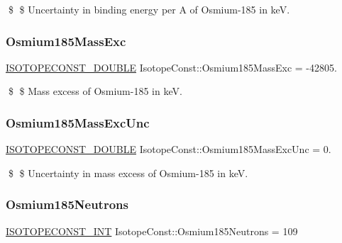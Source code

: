 \$ \$ Uncertainty in binding energy per A of Osmium-\/185 in keV. \mbox{\label{group___isotope_const-_osmium-_os185_ga5efefbb9a0abbb4d38bd90703bee7a6f}} 
\subsubsection{\texorpdfstring{Osmium185\+Mass\+Exc}{Osmium185MassExc}}
{\footnotesize\ttfamily \mbox{\hyperlink{group___isotope_const-_macros_ga8f45a7272ce02c0b4c65c44636ed719a}{I\+S\+O\+T\+O\+P\+E\+C\+O\+N\+S\+T\+\_\+\+D\+O\+U\+B\+LE}} Isotope\+Const\+::\+Osmium185\+Mass\+Exc = -\/42805.}

\$ \$ Mass excess of Osmium-\/185 in keV. \mbox{\label{group___isotope_const-_osmium-_os185_ga3ee3e0e8220e9ed0fe242b09e0298a56}} 
\subsubsection{\texorpdfstring{Osmium185\+Mass\+Exc\+Unc}{Osmium185MassExcUnc}}
{\footnotesize\ttfamily \mbox{\hyperlink{group___isotope_const-_macros_ga8f45a7272ce02c0b4c65c44636ed719a}{I\+S\+O\+T\+O\+P\+E\+C\+O\+N\+S\+T\+\_\+\+D\+O\+U\+B\+LE}} Isotope\+Const\+::\+Osmium185\+Mass\+Exc\+Unc = 0.}

\$ \$ Uncertainty in mass excess of Osmium-\/185 in keV. \mbox{\label{group___isotope_const-_osmium-_os185_ga92443289b652a344d4759f5a4003c30f}} 
\subsubsection{\texorpdfstring{Osmium185\+Neutrons}{Osmium185Neutrons}}
{\footnotesize\ttfamily \mbox{\hyperlink{group___isotope_const-_macros_ga5f18360b3e99483a35c32d789e62621c}{I\+S\+O\+T\+O\+P\+E\+C\+O\+N\+S\+T\+\_\+\+I\+NT}} Isotope\+Const\+::\+Osmium185\+Neutrons = 109}

